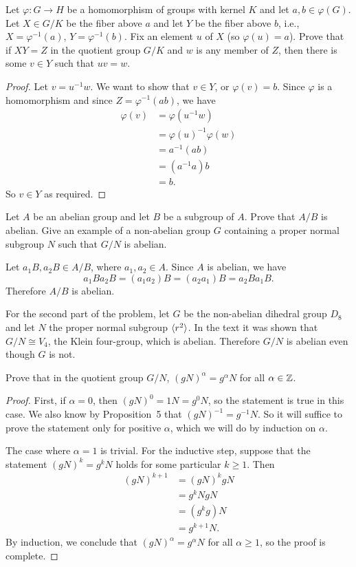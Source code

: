  Let $\varphi\colon G\to H$ be a homomorphism of groups with
kernel $K$ and let $a,b\in\varphi(G)$. Let $X\in G/K$ be the fiber
above $a$ and let $Y$ be the fiber above $b$, i.e.,
$X = \varphi^{-1}(a)$, $Y = \varphi^{-1}(b)$. Fix an element $u$ of
$X$ (so $\varphi(u) = a$). Prove that if $XY = Z$ in the quotient
group $G/K$ and $w$ is any member of $Z$, then there is some $v\in Y$
such that $uv = w$.
\begin{proof}
  Let $v = u^{-1}w$. We want to show that $v\in Y$, or
  $\varphi(v) = b$. Since $\varphi$ is a homomorphism and since
  $Z = \varphi^{-1}(ab)$, we have
  \begin{align*}
    \varphi(v) &= \varphi(u^{-1}w) \\
               &= \varphi(u)^{-1}\varphi(w) \\
               &= a^{-1}(ab) \\
               &= (a^{-1}a)b \\
               &= b.
  \end{align*}
  So $v\in Y$ as required.
\end{proof}

 Let $A$ be an abelian group and let $B$ be a subgroup of
$A$. Prove that $A/B$ is abelian. Give an example of a non-abelian
group $G$ containing a proper normal subgroup $N$ such that $G/N$ is
abelian.
\begin{solution}
  Let $a_1B, a_2B \in A/B$, where $a_1,a_2\in A$. Since $A$ is
  abelian, we have
  \begin{equation*}
    a_1Ba_2B = (a_1a_2)B = (a_2a_1)B = a_2Ba_1B.
  \end{equation*}
  Therefore $A/B$ is abelian.

  For the second part of the problem, let $G$ be the non-abelian
  dihedral group $D_8$ and let $N$ the proper normal subgroup
  $\langle{r^2}\rangle$. In the text it was shown that $G/N \cong V_4$, the
  Klein four-group, which is abelian. Therefore $G/N$ is abelian even
  though $G$ is not.
\end{solution}

\label{exercise:quotient-group:coset-exponent}
Prove that in the quotient group $G/N$,
$(gN)^\alpha = g^\alpha N$ for all $\alpha\in\mathbb{Z}$.
\begin{proof}
  First, if $\alpha = 0$, then $(gN)^0 = 1N = g^0N$, so the statement
  is true in this case. We also know by Proposition~5 that
  $(gN)^{-1} = g^{-1}N$. So it will suffice to prove the statement
  only for positive $\alpha$, which we will do by induction on
  $\alpha$.

  The case where $\alpha = 1$ is trivial. For the inductive step,
  suppose that the statement $(gN)^k = g^kN$ holds for some particular
  $k\geq1$. Then
  \begin{align*}
    (gN)^{k+1}
    &= (gN)^kgN \\
    &= g^kNgN \\
    &= (g^kg)N \\
    &= g^{k+1}N.
  \end{align*}
  By induction, we conclude that $(gN)^\alpha = g^\alpha N$ for all
  $\alpha\geq1$, so the proof is complete.
\end{proof}

